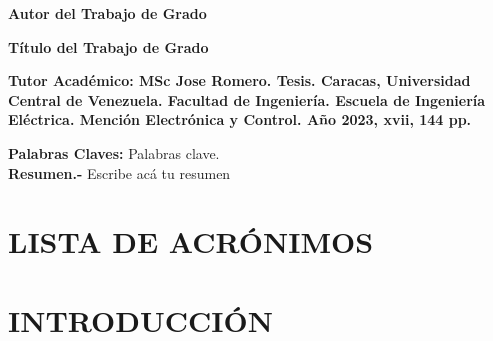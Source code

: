 \documentclass[letterpaper,titlepage,12pt,oneside,spanish,final]{report_eie}
\begin{document}
\newpage
\renewcommand*{\abstract}{\begin{center}\end{center}}
\begin{spacing}{1}
\begin{center}%

\textbf{Autor del Trabajo de Grado}

\begin{large}
\textbf{Título del Trabajo de Grado}
\end{large}
\end{center}

\noindent%
\textbf{Tutor Académico: MSc Jose Romero. Tesis.
Caracas, Universidad Central de Venezuela. Facultad de Ingeniería.
Escuela de Ingeniería Eléctrica. Mención Electrónica y Control. Año 2023,
xvii, 144 pp.}

\noindent
\textbf{Palabras Claves:} Palabras clave. \\[1ex]

\noindent \textbf{Resumen.-} Escribe acá tu resumen

\end{spacing}

%
\thispagestyle{empty}%
\renewcommand{\baselinestretch}{1.5}%
\addtocounter{page}{3}%
\setlength{\parskip}{3pt}%

\tableofcontents%

\listoffigures%

\listoftables%


\chapter*{LISTA DE ACRÓNIMOS}%
%


\chapter*{INTRODUCCIÓN}\label{CAP:intro}
\setlength{\parskip}{14pt}%
%
\end{document}
